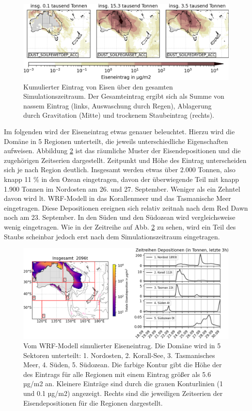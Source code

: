 \documentclass[12pt,a4paper,onecolumn,draft]{scrartcl}
\begin{document}
\begin{figure}
\includegraphics[width=\textwidth]{bilder/iron_deposition_vars.png}
\caption{Kumulierter Eintrag von Eisen über den gesamten Simulationszeitraum. Der Gesamteintrag ergibt sich als Summe von nassem Eintrag (links, Auswaschung durch Regen), Ablagerung durch Gravitation (Mitte) und trockenem Staubeintrag (rechts).} \label{fig:iron_deposition}
\end{figure}
Im folgenden wird der Eiseneintrag etwas genauer beleuchtet. Hierzu wird die Domäne in 5 Regionen unterteilt, die jeweils unterschiedliche Eigenschaften aufweisen. Abbildung \ref{fig:iron_deposition_sections} ist das räumliche Muster der Eisendepositionen und die zugehörigen Zeitserien dargestellt. Zeitpunkt und Höhe des Eintrag unterscheiden sich je nach Region deutlich. Insgesamt werden etwas über 2.000 Tonnen, also knapp 11 \% in den Ozean eingetragen, davon der überwiegende Teil mit knapp 1.900 Tonnen im Nordosten am 26. und 27. September. Weniger als ein Zehntel davon wird lt. WRF-Modell in das Korallenmeer und das Tasmanische Meer eingetragen. Diese Depositionen ereignen sich relativ zeitnah nach dem Red Dawn noch am 23. September. In den Süden und den Südozean wird vergleichsweise wenig eingetragen. Wie in der Zeitreihe auf Abb. \ref{fig:iron_deposition_sections} zu sehen, wird ein Teil des Staubs scheinbar jedoch erst nach dem Simulationszeitraum eingetragen.
\begin{figure}
\includegraphics[width=\textwidth]{bilder/total_iron.png}
\caption{Vom WRF-Modell simulierter Eiseneintrag. Die Domäne wird in 5 Sektoren unterteilt: 1. Nordosten, 2. Korall-See, 3. Tasmanisches Meer, 4. Süden, 5. Südozean. Die farbige Kontur gibt die Höhe der des Eintrags für alle Regionen mit einem Eintrag größer als 5.6 µg/m2 an. Kleinere Einträge sind durch die grauen Konturlinien (1 und 0.1 µg/m2) angezeigt. Rechts sind die jeweiligen Zeitserien der Eisendepositionen für die Regionen dargestellt.} \label{fig:iron_deposition_sections}
\end{figure}
\end{document}
